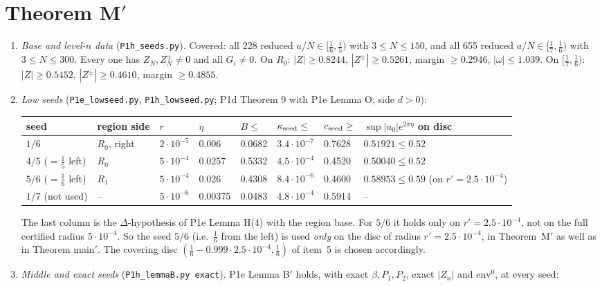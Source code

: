 \documentclass[11pt]{article}
\theoremstyle{remark}\newtheorem{remark}[theorem]{Remark}
\begin{document}
\section{Theorem M$'$}\label{sec:M}
\begin{proposition}\label{prop:cert}
\begin{enumerate}
\item \emph{Base and level-$n$ data} (\texttt{P1h\_seeds.py}). Covered: all 228 reduced $a/N\in[\frac16,\frac15)$ with $3\le N\le150$, and all 655 reduced $a/N\in[\frac17,\frac16)$ with $3\le N\le300$. Every one has $Z_N,Z^\pm_N\ne0$ and all $G_i\ne0$. On $R_0$: $|Z|\ge0.8244$, $|Z^\pm|\ge0.5261$, margin $\ge0.2946$, $|\omega|\le1.039$. On $[\frac17,\frac16)$: $|Z|\ge0.5452$, $|Z^\pm|\ge0.4610$, margin $\ge0.4855$.
\item \emph{Low seeds} (\texttt{P1e\_lowseed.py}, \texttt{P1h\_lowseed.py}; P1d Theorem 9 with P1e Lemma O; side $d>0$):
 \begin{center}\small\begin{tabular}{llllllll}\toprule
 seed & region side & $r$ & $\eta$ & $B\le$ & $\kappa_{\rm seed}\le$ & $c_{\rm seed}\ge$ & $\sup|u_0|e^{2\pi\eta}$ on disc\\\midrule
 $1/6$ & $R_0$, right & $2\cdot10^{-5}$ & 0.006 & 0.0682 & $3.4\cdot10^{-7}$ & 0.7628 & $0.51921\le0.52$\\
 $4/5$ ($=\frac15$ left) & $R_0$ & $5\cdot10^{-4}$ & 0.0257 & 0.5332 & $4.5\cdot10^{-4}$ & 0.4520 & $0.50040\le0.52$\\
 $5/6$ ($=\frac16$ left) & $R_1$ & $5\cdot10^{-4}$ & 0.026 & 0.4308 & $8.4\cdot10^{-6}$ & 0.4600 & $0.58953\le0.59$ (on $r'=2.5\cdot10^{-4}$)\\
 $1/7$ (not used) & -- & $5\cdot10^{-6}$ & 0.00375 & 0.0483 & $4.8\cdot10^{-4}$ & 0.5914 & --\\\bottomrule
 \end{tabular}\end{center}
 The last column is the $\Delta$-hypothesis of P1e Lemma H(4) with the region base. For $5/6$ it holds only on $r'=2.5\cdot10^{-4}$, not on the full certified radius $5\cdot10^{-4}$. So the seed $5/6$ (i.e.\ $\frac16$ from the left) is used \emph{only} on the disc of radius $r'=2.5\cdot10^{-4}$, in Theorem~M$'$ as well as in Theorem main$'$. The covering disc $(\frac16-0.999\cdot2.5\cdot10^{-4},\frac16)$ of item~5 is chosen accordingly.
\item \emph{Middle and exact seeds} (\texttt{P1h\_lemmaB.py exact}). P1e Lemma B$'$ holds, with exact $\beta,P_1,P_2$, exact $|Z_n|$ and $\mathrm{env}^0$, at every seed:

\end{enumerate}
\end{proposition}
\end{document}
